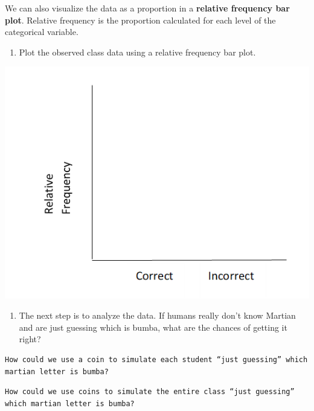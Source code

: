 \documentclass[
]{report}
\providecommand{\tightlist}{%
  \setlength{\itemsep}{0pt}\setlength{\parskip}{0pt}}
\begin{document}
We can also visualize the data as a proportion in a \textbf{relative frequency bar plot}. Relative frequency is the proportion calculated for each level of the categorical variable.

\begin{enumerate}
\def\labelenumi{\arabic{enumi}.}
\setcounter{enumi}{7}
\tightlist
\item
  Plot the observed class data using a relative frequency bar plot.
\end{enumerate}

\includegraphics{images/relative_barplot_martian.png}

\newpage

\begin{enumerate}
\def\labelenumi{\arabic{enumi}.}
\setcounter{enumi}{8}
\tightlist
\item
  The next step is to analyze the data. If humans really don't know Martian and are just guessing which is bumba, what are the chances of getting it right?
  \vspace{0.5in}
\end{enumerate}

\begin{verbatim}
How could we use a coin to simulate each student “just guessing” which martian letter is bumba? 
\end{verbatim}

\vspace{1in}

\begin{verbatim}
How could we use coins to simulate the entire class “just guessing” which martian letter is bumba? 
\end{verbatim}
\end{document}
